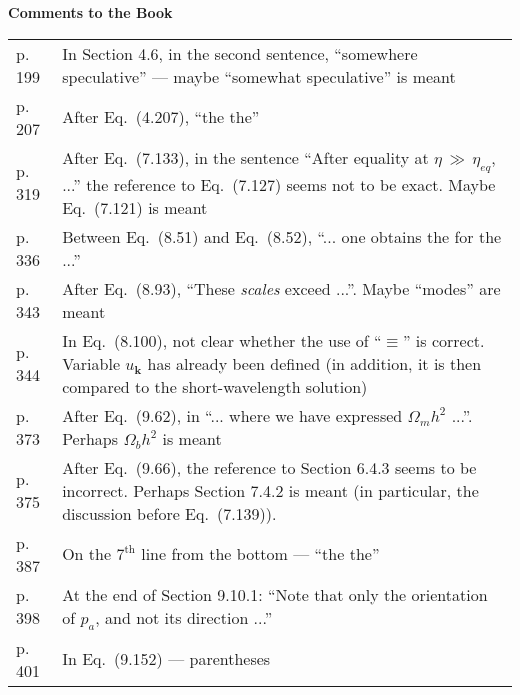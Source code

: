 \documentclass[12pt]{article}
\begin{document}
\centerline{\Huge\bf Comments to the Book}
\vspace{1.6cm}

\renewcommand{\arraystretch}{2.0}
\begin{tabular}{p{2cm}p{12.6cm}}
	p. 199	&	In Section 4.6, in the second sentence, ``somewhere speculative'' ---
			maybe ``somewhat speculative'' is meant
			\\
	p. 207	&	After Eq.~(4.207), ``the the''
			\\
	p. 319	&	After Eq.~(7.133), in the sentence ``After equality at $ \eta \,\gg\, \eta_{eq} $, ...''
			the reference to Eq.~(7.127) seems not to be exact. Maybe Eq.~(7.121) is meant
			\\
	p. 336	&	Between Eq.~(8.51) and Eq.~(8.52), ``... one obtains the for the ...''
			\\
	p. 343	&	After Eq.~(8.93), ``These {\it scales} exceed ...''. Maybe ``modes'' are meant
			\\
	p. 344	&	In Eq.~(8.100), not clear whether the use of ``$ \equiv $'' is correct. 
			Variable $ u_{\mathbf k} $ has already been defined 
			(in addition, it is then compared to the short-wavelength solution)
			\\
	p. 373	&	After Eq.~(9.62), in 
			``... where we have expressed $ \Omega_m h^2 $ ...''.
			Perhaps $ \Omega_b h^2 $ is meant
			\\
	p. 375	&	After Eq.~(9.66), the reference to Section 6.4.3 seems to be incorrect. 
			Perhaps Section 7.4.2 is meant (in particular, the discussion before Eq.~(7.139)).
			\\
	p. 387	&	On the $7^\text{th}$ line from the bottom --- ``the the''
			\\
	p. 398	&	At the end of Section 9.10.1: ``Note that only the orientation of $ p_a $, and not its direction ...''
			\\
	p. 401	&	In Eq.~(9.152) --- parentheses
\end{tabular}
\end{document}
